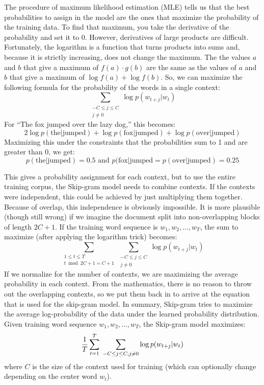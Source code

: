 The procedure of maximum likelihood estimation (MLE) tells us that the best
probabilities to assign in the model are the ones that maximize the probability
of the training data. To find that maximum, you take the derivative of the
probability and set it to 0. However, derivatives of large products are 
difficult. Fortunately, the logarithm is a function that turns products into
sums and, because it is strictly increasing, does not change the maximum. The
the values $a$ and $b$ that give a maximum of $f(a)\cdot{}g(b)$ are the same as 
the values of $a$ and $b$ that give a maximum of
$\log{f(a)} + \log{f(b)}$. So, we can maximize the following formula for the
probability of the words in a single context:
%
\[\sum_{\substack{-C \le j \le C \\ j \ne 0 }} \log{p(w_{t+j}|w_t)}\]
%
For ``The fox jumped over the lazy dog,'' this becomes:
%
\[2\log{p(\text{the|jumped})}+\log{p(\text{fox|jumped})}+\log{p(\text{over|jumped})}\]
%
Maximizing this under the constraints that the probabilities sum to 1 and are
greater than 0, we get:
\[p(\text{the|jumped})=0.5 \text{ and } p(\text{fox|jumped}=p(\text{over|jumped})=0.25\]

This gives a probability assignment for each context, but to use the entire
training corpus, the Skip-gram model needs to combine contexts. If the contexts
were independent, this could be achieved by just multiplying them together.
Because of overlap, this independence is obviously impossible. It is more
plausible (though still wrong) if we imagine the document split into 
non-overlapping blocks of length $2C+1$. If 
the training word sequence is $w_1, w_2, \ldots, w_T$, the 
sum to maximize (after applying the logarithm trick) becomes:
%
\[\sum_{\substack{1 \le t \le T \\ t \bmod 2C+1 = C+1 }}\sum_{\substack{-C \le j \le C \\ j \ne 0 }} \log{p(w_{t+j}|w_t)}\]
%
If we normalize for the number of contexts, we are maximizing the average
probability in each context. From the mathematics, there is no reason to throw
out the overlapping contexts, so we put them back in to arrive at the equation
that is used for the skip-gram model. In summary, Skip-gram 
tries to maximize the average 
log-probability of the data under the learned probability distribution. Given
training word sequence $w_1, w_2, \ldots, w_T$, the Skip-gram model maximizes:
%
\begin{equation}
  \label{eq:skipgramequation}
  \frac{1}{T}\sum_{t=1}^T \; \sum_{-C \le j \le C, \\ j \ne 0 } \log p(w_{t+j}|w_t)
\end{equation}
%
where $C$ is the size of the context used for training (which can optionally 
change depending on the center word $w_t$). 

